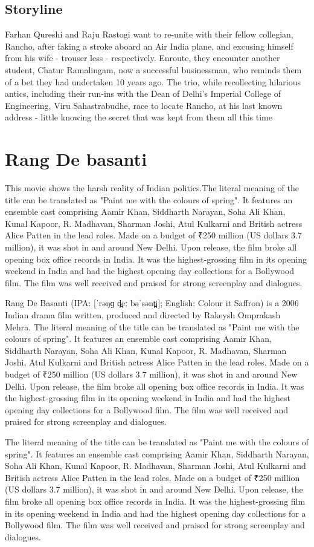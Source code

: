 \documentclass{article}
\begin{document}
\subsection{Storyline}
Farhan Qureshi and Raju Rastogi want to re-unite with their fellow collegian, Rancho, after faking a stroke aboard an Air India plane, and excusing himself from his wife - trouser less - respectively. Enroute, they encounter another student, Chatur Ramalingam, now a successful businessman, who reminds them of a bet they had undertaken 10 years ago. The trio, while recollecting hilarious antics, including their run-ins with the Dean of Delhi's Imperial College of Engineering, Viru Sahastrabudhe, race to locate Rancho, at his last known address - little knowing the secret that was kept from them all this time


\section{Rang De basanti}
This movie shows the harsh reality of Indian politics.The literal meaning of the title can be translated as "Paint me with the colours of spring". It features an ensemble cast comprising Aamir Khan, Siddharth Narayan, Soha Ali Khan, Kunal Kapoor, R. Madhavan, Sharman Joshi, Atul Kulkarni and British actress Alice Patten in the lead roles. Made on a budget of ₹250 million (US dollars 3.7 million), it was shot in and around New Delhi. Upon release, the film broke all opening box office records in India. It was the highest-grossing film in its opening weekend in India and had the highest opening day collections for a Bollywood film. The film was well received and praised for strong screenplay and dialogues.

Rang De Basanti (IPA: [ˈrəŋɡ d̪eː bəˈsənt̪i]; English: Colour it Saffron) is a 2006 Indian drama film written, produced and directed by Rakeysh Omprakash Mehra. The literal meaning of the title can be translated as "Paint me with the colours of spring". It features an ensemble cast comprising Aamir Khan, Siddharth Narayan, Soha Ali Khan, Kunal Kapoor, R. Madhavan, Sharman Joshi, Atul Kulkarni and British actress Alice Patten in the lead roles. Made on a budget of ₹250 million (US dollars 3.7 million), it was shot in and around New Delhi. Upon release, the film broke all opening box office records in India. It was the highest-grossing film in its opening weekend in India and had the highest opening day collections for a Bollywood film. The film was well received and praised for strong screenplay and dialogues.

The literal meaning of the title can be translated as "Paint me with the colours of spring". It features an ensemble cast comprising Aamir Khan, Siddharth Narayan, Soha Ali Khan, Kunal Kapoor, R. Madhavan, Sharman Joshi, Atul Kulkarni and British actress Alice Patten in the lead roles. Made on a budget of ₹250 million (US dollars 3.7 million), it was shot in and around New Delhi. Upon release, the film broke all opening box office records in India. It was the highest-grossing film in its opening weekend in India and had the highest opening day collections for a Bollywood film. The film was well received and praised for strong screenplay and dialogues.
\end{document}
